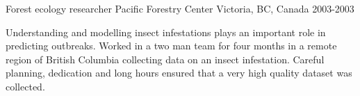 \begin{cventries}



\cventry
{Forest ecology researcher} %
{Pacific Forestry Center} %
{Victoria, BC, Canada} %
{2003-2003} %
{ %
\begin{cvitems}
\item {Understanding and modelling insect infestations plays an important role in predicting outbreaks. Worked in a two man team for four months in a remote region of British Columbia collecting data on an insect infestation. Careful planning, dedication and long hours ensured that a very high quality dataset was collected.}
\end{cvitems}
}
\end{cventries}
